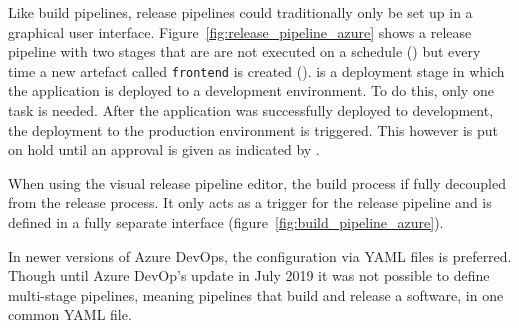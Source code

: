 Like build pipelines, release pipelines could traditionally only be set up in a
graphical user interface. Figure~\ref{fig:release_pipeline_azure} shows a
release pipeline with two stages that are are not executed on a schedule
() but every time a new artefact called \texttt{frontend} is created
().  is a deployment stage in which the application is
deployed to a development environment. To do this, only one task is needed.
After the application was successfully deployed to development, the deployment
to the production environment is triggered. This however is put on hold until
an approval is given as indicated by .

When using the visual release pipeline editor, the build process if fully
decoupled from the release process. It only acts as a trigger for the release
pipeline and is defined in a fully separate interface
(figure~\ref{fig:build_pipeline_azure}). 

In newer versions of Azure DevOps, the configuration via YAML files is
preferred. Though until Azure DevOp's update in July 2019 it was not possible
to define multi-stage pipelines, meaning pipelines that build and release a
software, in one common YAML file.
